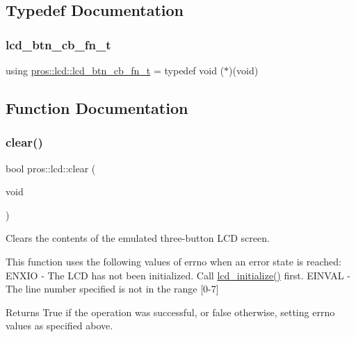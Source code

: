 \subsection{Typedef Documentation}
\mbox{\label{namespacepros_1_1lcd_ab5c0cdcf37795ff2a9dcaf546b087dd4}} 
\subsubsection{\texorpdfstring{lcd\+\_\+btn\+\_\+cb\+\_\+fn\+\_\+t}{lcd\_btn\_cb\_fn\_t}}
{\footnotesize\ttfamily using \hyperlink{namespacepros_1_1lcd_ab5c0cdcf37795ff2a9dcaf546b087dd4}{pros\+::lcd\+::lcd\+\_\+btn\+\_\+cb\+\_\+fn\+\_\+t} = typedef void ($\ast$)(void)}



\subsection{Function Documentation}
\mbox{\label{namespacepros_1_1lcd_a8d22379bd680a36182d51d8e8ef02baf}} 
\subsubsection{\texorpdfstring{clear()}{clear()}}
{\footnotesize\ttfamily bool pros\+::lcd\+::clear (\begin{DoxyParamCaption}\item[{void}]{ }\end{DoxyParamCaption})}

Clears the contents of the emulated three-\/button L\+CD screen.

This function uses the following values of errno when an error state is reached\+: E\+N\+X\+IO -\/ The L\+CD has not been initialized. Call \hyperlink{llemu_8h_ae618494f080e95b506c0c18cb1ffb407}{lcd\+\_\+initialize()} first. E\+I\+N\+V\+AL -\/ The line number specified is not in the range \mbox{[}0-\/7\mbox{]}

\begin{DoxyReturn}{Returns}
True if the operation was successful, or false otherwise, setting errno values as specified above. 
\end{DoxyReturn}
\mbox{\label{namespacepros_1_1lcd_aef44947cea9006f86d4aaa2e32856835}} 
